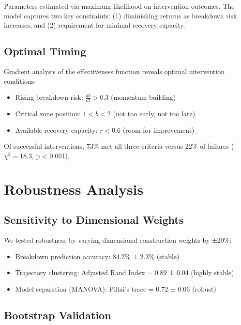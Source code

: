 \documentclass[11pt,letterpaper]{article}
\newcommand{\breakdownPredictionAccuracy}{84.2\%}
\newcommand{\predictionAccuracySD}{2.3\%}
\newcommand{\clusteringARI}{0.89}
\newcommand{\clusteringARISD}{0.04}
\newcommand{\manovaPillai}{0.72}
\newcommand{\manovaPillaiSD}{0.06}
\newcommand{\optimalTimingSuccessRate}{73\%}
\newcommand{\optimalTimingFailureRate}{22\%}
\newcommand{\optimalTimingChiSquare}{18.3}
\newcommand{\optimalTimingPValue}{< 0.001}
\newcommand{\driftCoeff}{0.3}
\newcommand{\criticalZoneLower}{1}
\newcommand{\criticalZoneUpper}{2}
\newcommand{\recoveryCapacityThreshold}{0.6}
\newcommand{\weightVariation}{20}
\begin{document}
Parameters estimated via maximum likelihood on intervention outcomes. The model captures two key constraints: (1) diminishing returns as breakdown risk increases, and (2) requirement for minimal recovery capacity.

\subsection{Optimal Timing}

Gradient analysis of the effectiveness function reveals optimal intervention conditions:
\begin{itemize}
    \item Rising breakdown risk: $\frac{db}{dt} > \driftCoeff{}$ (momentum building)
    \item Critical zone position: $\criticalZoneLower{} < b < \criticalZoneUpper{}$ (not too early, not too late)
    \item Available recovery capacity: $r < \recoveryCapacityThreshold{}$ (room for improvement)
\end{itemize}

Of successful interventions, \optimalTimingSuccessRate{} met all three criteria versus \optimalTimingFailureRate{} of failures ($\chi^2 = \optimalTimingChiSquare{}$, p \optimalTimingPValue{}).

\section{Robustness Analysis}

\subsection{Sensitivity to Dimensional Weights}

We tested robustness by varying dimensional construction weights by ±\weightVariation{}\%:

\begin{itemize}
    \item Breakdown prediction accuracy: \breakdownPredictionAccuracy{} ± \predictionAccuracySD{} (stable)
    \item Trajectory clustering: Adjusted Rand Index = \clusteringARI{} ± \clusteringARISD{} (highly stable)
    \item Model separation (MANOVA): Pillai's trace = \manovaPillai{} ± \manovaPillaiSD{} (robust)
\end{itemize}

\subsection{Bootstrap Validation}
\end{document}
